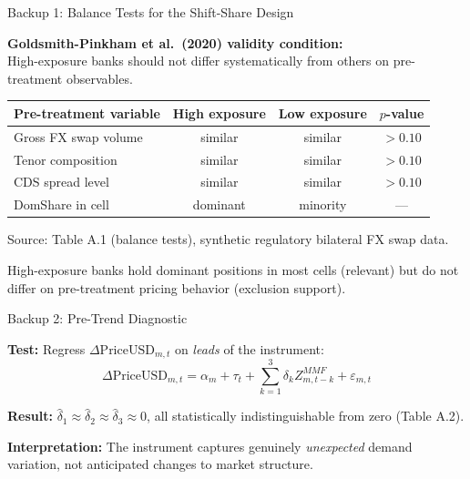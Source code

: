 \documentclass[aspectratio=169, 10pt]{beamer}
\begin{document}
\begin{frame}{Backup 1: Balance Tests for the Shift-Share Design}

  \textbf{Goldsmith-Pinkham et al.\ (2020) validity condition:}\\
  High-exposure banks should not differ systematically from others on
  pre-treatment observables.

  \bigskip

  \begin{center}
  \begin{tabular}{lccc}
    \toprule
    Pre-treatment variable & High exposure & Low exposure & $p$-value \\
    \midrule
    Gross FX swap volume & similar & similar & $> 0.10$ \\
    Tenor composition & similar & similar & $> 0.10$ \\
    CDS spread level & similar & similar & $> 0.10$ \\
    \midrule
    DomShare in cell & dominant & minority & --- \\
    \bottomrule
  \end{tabular}
  \end{center}

  {\color{dimgray}\small Source: Table A.1 (balance tests), synthetic regulatory bilateral FX swap data.}

  \bigskip

  High-exposure banks hold dominant positions in most cells (relevant) but
  do not differ on pre-treatment pricing behavior (exclusion support).

\end{frame}

\begin{frame}{Backup 2: Pre-Trend Diagnostic}

  \textbf{Test:} Regress $\Delta\text{PriceUSD}_{m,t}$ on \emph{leads} of the instrument:
  \[
    \Delta\text{PriceUSD}_{m,t} = \alpha_m + \tau_t +
    \sum_{k=1}^{3} \delta_k Z_{m,t-k}^{MMF} + \varepsilon_{m,t}
  \]

  \bigskip

  \textbf{Result:} $\hat\delta_1 \approx \hat\delta_2 \approx \hat\delta_3 \approx 0$,
  all statistically indistinguishable from zero (Table A.2).

  \bigskip

  \textbf{Interpretation:} The instrument captures genuinely \emph{unexpected} demand variation,
  not anticipated changes to market structure.

\end{frame}
\end{document}
